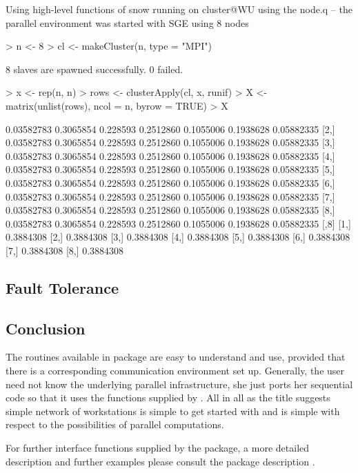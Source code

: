 \begin{Example} Using high-level functions of snow\newline
running on cluster@WU using the node.q -- the parallel environment was
started with SGE using 8 nodes

\begin{Schunk}
\begin{Sinput}
> n <- 8
> cl <- makeCluster(n, type = "MPI")
\end{Sinput}
\begin{Soutput}
	8 slaves are spawned successfully. 0 failed.
\end{Soutput}
\begin{Sinput}
> x <- rep(n, n)
> rows <- clusterApply(cl, x, runif)
> X <- matrix(unlist(rows), ncol = n, byrow = TRUE)
> X
\end{Sinput}
\begin{Soutput}
           [,1]      [,2]     [,3]      [,4]      [,5]      [,6]       [,7]
[1,] 0.03582783 0.3065854 0.228593 0.2512860 0.1055006 0.1938628 0.05882335
[2,] 0.03582783 0.3065854 0.228593 0.2512860 0.1055006 0.1938628 0.05882335
[3,] 0.03582783 0.3065854 0.228593 0.2512860 0.1055006 0.1938628 0.05882335
[4,] 0.03582783 0.3065854 0.228593 0.2512860 0.1055006 0.1938628 0.05882335
[5,] 0.03582783 0.3065854 0.228593 0.2512860 0.1055006 0.1938628 0.05882335
[6,] 0.03582783 0.3065854 0.228593 0.2512860 0.1055006 0.1938628 0.05882335
[7,] 0.03582783 0.3065854 0.228593 0.2512860 0.1055006 0.1938628 0.05882335
[8,] 0.03582783 0.3065854 0.228593 0.2512860 0.1055006 0.1938628 0.05882335
          [,8]
[1,] 0.3884308
[2,] 0.3884308
[3,] 0.3884308
[4,] 0.3884308
[5,] 0.3884308
[6,] 0.3884308
[7,] 0.3884308
[8,] 0.3884308
\end{Soutput}
\end{Schunk}
\label{ex:snowapply}
\end{Example}

\subsection{Fault Tolerance}



\subsection{Conclusion}

The routines available in package  are easy to understand
and use, provided that there is a corresponding communication
environment set up. Generally, the user need not know the underlying
parallel infrastructure, she just ports her sequential code so that it
uses the functions supplied by . All in all as the title
suggests simple network of workstations is simple to get started with
and is simple with respect to the possibilities of parallel
computations. 

For further interface functions supplied by the  package, a
more detailed 
description and further examples please consult the package description
\cite{tierney07snow}.
